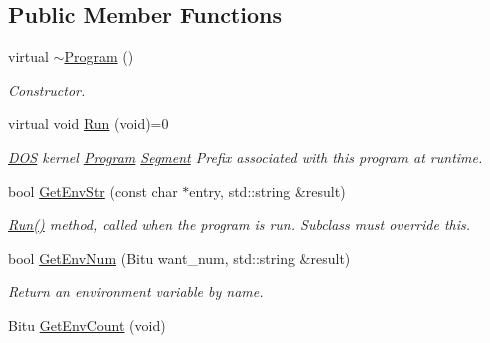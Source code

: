 \subsection*{Public Member Functions}
\begin{DoxyCompactItemize}
\item 
virtual \hyperlink{classProgram_a2df844d46504a414498c2140de94bfef}{$\sim$\-Program} ()
\begin{DoxyCompactList}\small\item\em Constructor. \end{DoxyCompactList}\item 
\hypertarget{classProgram_acd37c94c3c12a55650a05ee1449aa176}{virtual void \hyperlink{classProgram_acd37c94c3c12a55650a05ee1449aa176}{Run} (void)=0}\label{classProgram_acd37c94c3c12a55650a05ee1449aa176}

\begin{DoxyCompactList}\small\item\em \hyperlink{classDOS}{D\-O\-S} kernel \hyperlink{classProgram}{Program} \hyperlink{structSegment}{Segment} Prefix associated with this program at runtime. \end{DoxyCompactList}\item 
\hypertarget{classProgram_a0012adb877f24b04d836a37ab48f2c60}{bool \hyperlink{classProgram_a0012adb877f24b04d836a37ab48f2c60}{Get\-Env\-Str} (const char $\ast$entry, std\-::string \&result)}\label{classProgram_a0012adb877f24b04d836a37ab48f2c60}

\begin{DoxyCompactList}\small\item\em \hyperlink{classProgram_acd37c94c3c12a55650a05ee1449aa176}{Run()} method, called when the program is run. Subclass must override this. \end{DoxyCompactList}\item 
\hypertarget{classProgram_af0afe08af18d745d56642222a12034c9}{bool \hyperlink{classProgram_af0afe08af18d745d56642222a12034c9}{Get\-Env\-Num} (Bitu want\-\_\-num, std\-::string \&result)}\label{classProgram_af0afe08af18d745d56642222a12034c9}

\begin{DoxyCompactList}\small\item\em Return an environment variable by name. \end{DoxyCompactList}\item 
\hypertarget{classProgram_a67b647d573493de3f7237fe075a8532d}{Bitu \hyperlink{classProgram_a67b647d573493de3f7237fe075a8532d}{Get\-Env\-Count} (void)}\label{classProgram_a67b647d573493de3f7237fe075a8532d}


\end{DoxyCompactItemize}
